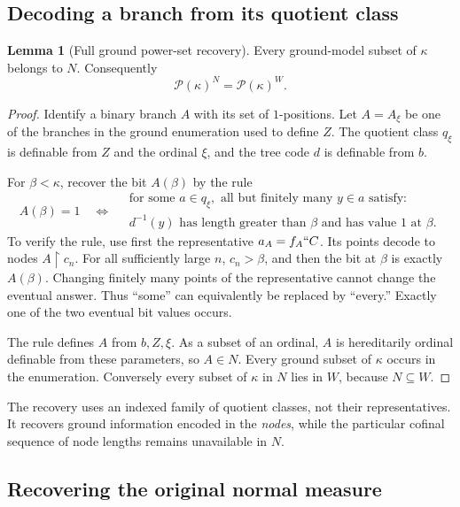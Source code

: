 \documentclass[11pt,letterpaper]{article}
\theoremstyle{definition}
\newtheorem{lemma}[definition]{Lemma}
\numberwithin{equation}{section}
\newcommand{\Pow}{\mathcal P}
\newcommand{\restr}{\mathbin{\upharpoonright}}
\begin{document}
\subsection{Decoding a branch from its quotient class}

\begin{lemma}[Full ground power-set recovery]\label{lem:recover}
Every ground-model subset of $\kappa$ belongs to $N$. Consequently
\[
 \Pow(\kappa)^N=\Pow(\kappa)^W.
\]
\end{lemma}
\begin{proof}
Identify a binary branch $A$ with its set of $1$-positions. Let $A=A_\xi$ be one of the branches in the ground enumeration used to define $Z$. The quotient class $q_\xi$ is definable from $Z$ and the ordinal $\xi$, and the tree code $d$ is definable from $b$.

For $\beta<\kappa$, recover the bit $A(\beta)$ by the rule
\begin{equation}\label{eq:decode}
 A(\beta)=1\quad\Longleftrightarrow\quad
 \begin{gathered}
 \text{for some }a\in q_\xi,\text{ all but finitely many }y\in a\text{ satisfy:}\\[-2pt]
 d^{-1}(y)\text{ has length greater than }\beta
 \text{ and has value }1\text{ at }\beta.
 \end{gathered}
\end{equation}
To verify the rule, use first the representative $a_A=f_A``C$. Its points decode to nodes $A\restr c_n$. For all sufficiently large $n$, $c_n>\beta$, and then the bit at $\beta$ is exactly $A(\beta)$. Changing finitely many points of the representative cannot change the eventual answer. Thus ``some'' can equivalently be replaced by ``every.'' Exactly one of the two eventual bit values occurs.

The rule defines $A$ from $b,Z,\xi$. As a subset of an ordinal, $A$ is hereditarily ordinal definable from these parameters, so $A\in N$. Every ground subset of $\kappa$ occurs in the enumeration. Conversely every subset of $\kappa$ in $N$ lies in $W$, because $N\subseteq W$.
\end{proof}

The recovery uses an indexed family of quotient classes, not their representatives. It recovers ground information encoded in the \emph{nodes}, while the particular cofinal sequence of node lengths remains unavailable in $N$.

\subsection{Recovering the original normal measure}
\end{document}
